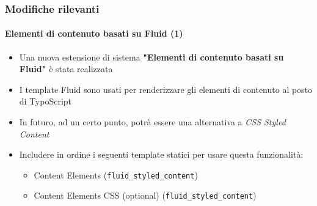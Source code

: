 \begin{frame}[fragile]
	\frametitle{Modifiche rilevanti}
	\framesubtitle{Elementi di contenuto basati su Fluid (1)}

	\begin{itemize}

		\item Una nuova estensione di sistema \textbf{"Elementi di contenuto basati su Fluid"} è stata realizzata

		\item I template Fluid sono usati per renderizzare gli elementi di contenuto al posto di TypoScript

		\item In futuro, ad un certo punto, potrà essere una alternativa a \textit{CSS Styled Content}

		\item Includere in ordine i seguenti template statici per usare questa funzionalità:

			\begin{itemize}
				\item Content Elements (\texttt{fluid\_styled\_content})
				\item Content Elements CSS (optional) (\texttt{fluid\_styled\_content})
			\end{itemize}

	\end{itemize}

\end{frame}




